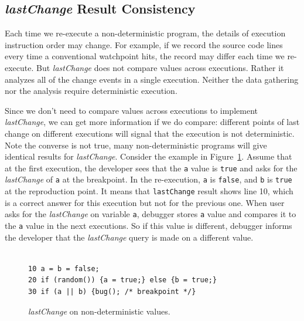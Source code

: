 \documentclass{sig-alternate}
\begin{document}
\subsection{{\large\bf\textit{lastChange}} Result Consistency}
\label{sec:resultConsistency}

Each time we re-execute a non-deterministic program, 
the details of execution instruction order may change. 
For example, if we record the source code lines every time
a conventional watchpoint hits, the record may differ each time we
re-execute. But \textit{lastChange} does not compare values across 
executions. Rather it analyzes all of the
change events in a single execution. 
Neither the data gathering nor the analysis require deterministic execution.

Since we don't need to compare values across executions to implement \textit{lastChange}, we can get more information if we do compare:
 different points of last change on different executions will signal that the execution is not deterministic. Note the converse is not true, many non-deterministic 
programs will give identical results for \textit{lastChange}.
Consider the example in Figure~\ref{fig:nondeterministic-values}. 
Assume that at the first execution, the developer sees that the \texttt{a} value is \texttt{true} and asks
for the \textit{lastChange} of \texttt{a} at the breakpoint. In the re-execution, \texttt{a} is \texttt{false},
and \texttt{b} is \texttt{true} at the reproduction point. It means that \texttt{lastChange}
result shows line 10, which is a correct answer for this execution but not for the previous one.
When user asks for the \textit{lastChange} on variable \texttt{a}, debugger stores \texttt{a} value and compares
it to the \texttt{a} value in the next executions. So if this value is different, debugger informs the developer
that the \textit{lastChange} query is made on a different value.

\begin{figure}[htp]
\lstset{basicstyle=\scriptsize}
\begin{lstlisting}[frame=single, language=myLang]%, framerule=0pt]

10 a = b = false;
20 if (random()) {a = true;} else {b = true;}
30 if (a || b) {bug(); /* breakpoint */}
\end{lstlisting}
\caption{\textit{lastChange} on non-deterministic values.}
\label{fig:nondeterministic-values}
\end{figure}
\end{document}
